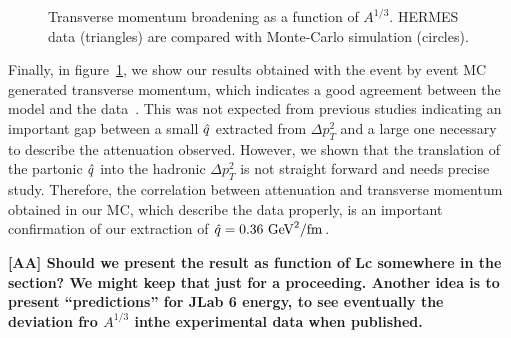 \begin{figure}[tbp]
  \centering
{}
\caption {Transverse momentum broadening as a function of $A^{1/3}$. HERMES 
data \cite{Airapetian:2009jy} (triangles) are compared with Monte-Carlo 
simulation (circles).}
\label{fig:PtA}
\end{figure}

Finally, in figure~\ref{fig:PtA}, we show our results obtained with the event by event MC generated transverse momentum, which indicates a good agreement between the model and the data~\cite{Airapetian:2009jy}. This was not expected from previous studies indicating an important gap between a small ${\hat q}$ extracted from $\Delta p_T^2$ and a large one necessary to describe the attenuation observed. However, we shown that the translation of the partonic ${\hat q}$ into the hadronic $\Delta p_T^2$ is not straight forward and needs precise study. Therefore, the correlation between attenuation and transverse momentum obtained in our MC, which describe the data properly, is an important confirmation of our extraction of ${\hat q} = 0.36\ \text{GeV}^2/ \text{fm}$.

{\bf [AA] Should we present the result as function of Lc somewhere in the section? We might keep that just for a proceeding. Another idea is to present ``predictions'' for JLab 6 energy, to see eventually the deviation fro $A^{1/3}$ inthe experimental data when published.}


